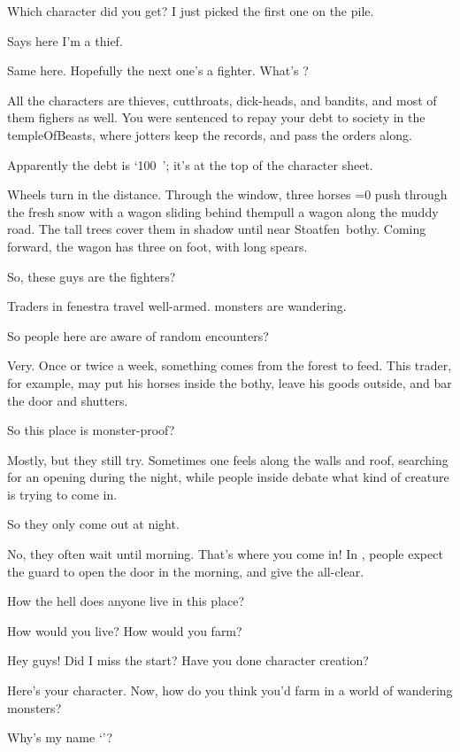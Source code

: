 \begin{multicols}{2}
\begin{description}
  Which character did you get?
  I just picked the first one on the pile.
  \item[Player 2:]
  Says here I'm a thief.
  \item[Player 1:]
  Same here.
  Hopefully the next one's a fighter.
  What's ?
  \item[\Glsentrytext{gm}:]
  All the characters are thieves, cutthroats, dick-heads, and bandits, and most of them fighers as well.
  You were sentenced to repay your debt to society in the \gls{templeOfBeasts}, where \glspl{jotter} keep the records, and pass the orders along.
  \item[Player 1:]
  Apparently the debt is `100~'; it's at the top of the character sheet.
  \item[\Glsentrytext{gm}:]
  Wheels turn in the distance.
  Through the window, three horses \ifnum\value{temperature}=0 push through the fresh snow with a wagon sliding behind them\else pull a wagon along the muddy road\fi.
  The tall trees cover them in shadow until near Stoatfen~\Gls{bothy}.
  Coming forward, the wagon has three on foot, with long spears.
  \item[Player 1:]
  So, these guys are the fighters? 
  \item[\Glsentrytext{gm}:]
  Traders in \gls{fenestra} travel well-armed.
  \Glspl{monster} are wandering.
  \item[Player 1:]
  So people here are aware of random encounters?
  \item[\Glsentrytext{gm}:]
  Very.
  Once or twice a week, something comes from the forest to feed.
  This trader, for example, may put his horses inside the \gls{bothy}, leave his goods outside, and bar the door and shutters.
  \item[Player 2:]
  So this place is \gls{monster}-proof?
  \item[\Glsentrytext{gm}:]
  Mostly, but they still try.
  Sometimes one feels along the walls and roof, searching for an opening during the night, while people inside debate what kind of creature is trying to come in.
  \item[Player 1:]
  So they only come out at night.
  \item[\Glsentrytext{gm}:]
  No, they often wait until morning.
  That's where you come in!
  In , people expect the \gls{guard} to open the door in the morning, and give the all-clear.
  \item[Player 2:]
  How the hell does anyone live in this place?
  \item[\Glsentrytext{gm}:]
  How would you live?
  How would you farm?
  \item[Player 3:]
  Hey guys!
  Did I miss the start?
  Have you done character creation?
  \item[\Glsentrytext{gm}:]
  Here's your character.
  Now, how do you think you'd farm in a world of wandering monsters?
  \item[Player 3:]
  Why's my name `\composeHumanName'?
\end{description}


\end{multicols}
